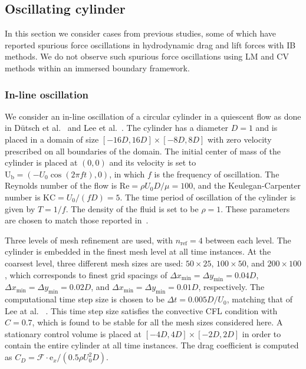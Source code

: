 \documentclass[review]{elsarticle}
\renewcommand{\vec}[1]{\bm{\mathrm{#1}}}
\def \e{\vec{e}}
\def \U{\vec{U}}
\def \cF{\vec{\mathcal{F}}}
\def \U{\vec{U}}
\def \Ub{\U_{\text{b}}}
\def \e{\vec{e}}
\def \nref{n_{\text{ref}}}
\def \Re{\text{Re}}
\def \dt{\Delta t}
\def \dx{\Delta x}
\def \dy{\Delta y}
\def \dt{\Delta t}
\def \dx{\Delta x}
\newcommand{\REVIEW}[1]{{#1}}
\begin{document}
\subsection{Oscillating cylinder}
In this section we consider cases from previous studies, some of which have reported 
spurious force oscillations in hydrodynamic drag and lift forces with IB methods. 
We do not observe such spurious force oscillations using LM and CV methods within
an immersed boundary framework.  

\subsubsection{In-line oscillation}
We consider an in-line oscillation of a circular cylinder in a quiescent
flow as done in D\"{u}tsch et al.~\cite{Dutsch98} and Lee et al.~\cite{Lee11}. 
The cylinder has a diameter $D = 1$ and is placed in a domain of size
$[-16D,16D] \times [-8D, 8D]$ with zero velocity prescribed on all boundaries
of the domain. The initial center of mass of the cylinder is placed at $ (0,0)$ and its 
velocity is set to $\Ub = \left(-U_0 \cos(2 \pi f t), 0\right)$, in which
$f$ is the frequency of oscillation. The Reynolds number of the flow is $\Re = \rho U_0 D/\mu = 100$,
and the Keulegan-Carpenter number is $\text{KC} = U_0/(fD) = 5$.
The time period of oscillation of the cylinder is given by $T = 1/f$.
The density of the fluid is set to be $\rho = 1$.
These parameters are chosen to match those reported in~\cite{Lee11, Dutsch98}.

Three levels of mesh refinement
are used, with $\nref = 4$ between each level. The cylinder is embedded in the finest mesh level
at all time instances. At the coarsest level, three different mesh sizes are used:
$50 \times 25$, $100 \times 50$, and $200 \times 100$, which corresponds to finest grid
spacings of $\dx_\textrm{min} = \dy_\textrm{min} = 0.04D$,
$\dx_\textrm{min} = \dy_\textrm{min} = 0.02D$, and $\dx_\textrm{min} = \dy_\textrm{min} = 0.01D$,
respectively. 
The computational time step size is chosen to be $\dt = 0.005D/U_0$, matching that of Lee at al. ~\cite{Lee11}.
\REVIEW{This time step size satisfies the convective CFL condition with $C = 0.7$, which is found to be stable for
all the mesh sizes considered here.}
A stationary control volume is placed at $[-4D, 4D] \times [-2D, 2D]$ in order to contain the entire cylinder at all time instances. The drag coefficient is computed as $C_D = \cF \cdot \e_x/(0.5 \rho U_0^2D)$.
\end{document}
